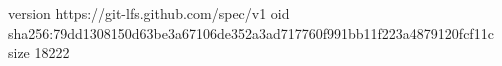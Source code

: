 version https://git-lfs.github.com/spec/v1
oid sha256:79dd1308150d63be3a67106de352a3ad717760f991bb11f223a4879120fcf11c
size 18222
